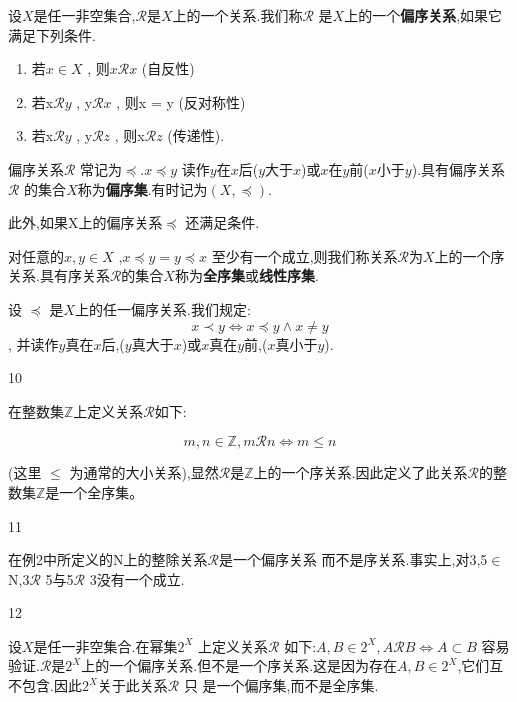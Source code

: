 \begin{mydef*}{}

设$X$是任一非空集合,\(\mathscr{R}\)是$X$上的一个关系.我们称\(\mathscr{R}\) 是$X$上的一个\textbf{偏序关系},如果它满足下列条件.

\begin{enumerate}[label = \arabic*)]
\item
  若\(x \in X\) , 则\(x \mathscr{R} x\)  (自反性)
\item
  若x\(\mathscr{R}y\) , y\(\mathscr{R}x\) , 则x = y (反对称性)
\item
  若x\(\mathscr{R}y\) , y\(\mathscr{R}z\) , 则x\(\mathscr{R}z\) (传递性).
\end{enumerate}

偏序关系\(\mathscr{R}\) 常记为\(\preceq\).\(x \preceq y\) 读作$y$在$x$后($y$大于$x$)或$x$在$y$前($x$小于$y$).具有偏序关系\(\mathscr{R}\) 的集合$X$称为\textbf{偏序集}.有时记为$(X,\preceq)$.

此外,如果X上的偏序关系\(\preceq\) 还满足条件.

对任意的\(x,y \in X\) ,\(x \preceq y = y \preceq x\) 至少有一个成立,则我们称关系\(\mathscr{R}\)为$X$上的一个序关系.具有序关系\(\mathscr{R}\)的集合$X$称为\textbf{全序集}或\textbf{线性序集}.
\end{mydef*}

设 \(\preceq\) 是$X$上的任一偏序关系.我们规定:
\[x \prec y \Longleftrightarrow x \preceq y \land x \neq y\] ,
并读作$y$真在$x$后,($y$真大于$x$)或$x$真在$y$前,($x$真小于$y$).


\begin{sourceexample}{10}

在整数集$\mathbb{Z}$上定义关系$\mathscr{R}$如下:

\[m, n \in \mathbb{Z}, m \mathscr{R} n \iff m \leqslant n\]

(这里 \(\leq\) 为通常的大小关系),显然$\mathscr{R}$是$\mathbb{Z}$上的一个序关系.因此定义了此关系$\mathscr{R}$的整数集$\mathbb{Z}$是一个全序集。
\end{sourceexample}


\begin{sourceexample}{11}

在例2中所定义的N上的整除关系$\mathscr{R}$是一个偏序关系 而不是序关系.事实上,对3,5\(\in\) N,3\(\mathscr{R}\) 5与5\(\mathscr{R}\) 3没有一个成立.

\end{sourceexample}

\begin{sourceexample}{12}

设$X$是任一非空集合.在幂集\(2^{X}\) 上定义关系\(\mathscr{R}\) 如下:\(A, B \in 2^{X}, A \mathscr{R} B \iff A \subset B\)
容易验证.$\mathscr{R}$是$2^{X}$上的一个偏序关系.但不是一个序关系.这是因为存在\(A,B \in2^X\),它们互不包含.因此\(2^X\)关于此关系\(\mathscr{R}\) 只 是一个偏序集,而不是全序集.
\end{sourceexample}




